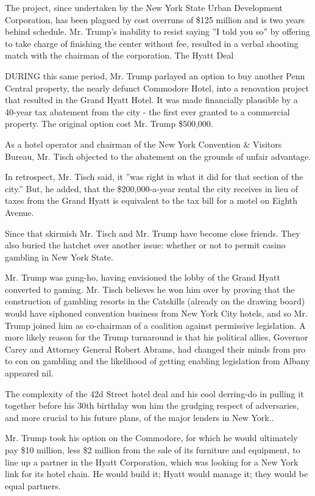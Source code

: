 The project, since undertaken by the New York State Urban Development
Corporation, has been plagued by cost overruns of \$125 million and is
two years behind schedule. Mr. Trump's inability to resist saying ''I
told you so'' by offering to take charge of finishing the center without
fee, resulted in a verbal shooting match with the chairman of the
corporation. The Hyatt Deal

DURING this same period, Mr. Trump parlayed an option to buy another
Penn Central property, the nearly defunct Commodore Hotel, into a
renovation project that resulted in the Grand Hyatt Hotel. It was made
financially plausible by a 40-year tax abatement from the city - the
first ever granted to a commercial property. The original option cost
Mr. Trump \$500,000.

As a hotel operator and chairman of the New York Convention \& Visitors
Bureau, Mr. Tisch objected to the abatement on the grounds of unfair
advantage.

In retrospect, Mr. Tisch said, it ''was right in what it did for that
section of the city.'' But, he added, that the \$200,000-a-year rental
the city receives in lieu of taxes from the Grand Hyatt is equivalent to
the tax bill for a motel on Eighth Avenue.

Since that skirmish Mr. Tisch and Mr. Trump have become close friends.
They also buried the hatchet over another issue: whether or not to
permit casino gambling in New York State.

Mr. Trump was gung-ho, having envisioned the lobby of the Grand Hyatt
converted to gaming. Mr. Tisch believes he won him over by proving that
the construction of gambling resorts in the Catskills (already on the
drawing board) would have siphoned convention business from New York
City hotels, and so Mr. Trump joined him as co-chairman of a coalition
against permissive legislation. A more likely reason for the Trump
turnaround is that his political allies, Governor Carey and Attorney
General Robert Abrams, had changed their minds from pro to con on
gambling and the likelihood of getting enabling legislation from Albany
appeared nil.

The complexity of the 42d Street hotel deal and his cool derring-do in
pulling it together before his 30th birthday won him the grudging
respect of adversaries, and more crucial to his future plans, of the
major lenders in New York..

Mr. Trump took his option on the Commodore, for which he would
ultimately pay \$10 million, less \$2 million from the sale of its
furniture and equipment, to line up a partner in the Hyatt Corporation,
which was looking for a New York link for its hotel chain. He would
build it; Hyatt would manage it; they would be equal partners.

